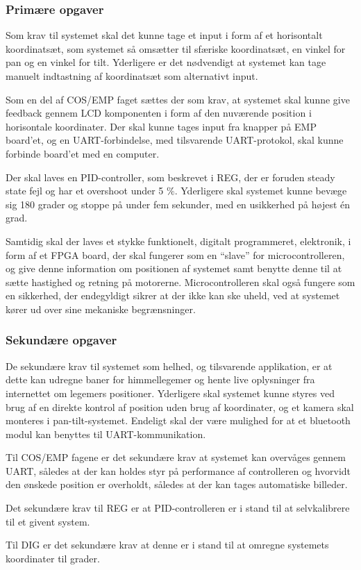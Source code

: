 \subsubsection{Primære opgaver}

Som krav til systemet skal det kunne tage et input i form af et horisontalt koordinatsæt, som systemet så omsætter til sfæriske koordinatsæt, en vinkel for pan og en vinkel for tilt. Yderligere er det nødvendigt at systemet kan tage manuelt indtastning af koordinatsæt som alternativt input.

Som en del af COS/EMP faget sættes der som krav, at systemet skal kunne give feedback gennem LCD komponenten i form af den nuværende position i horisontale koordinater. Der skal kunne tages input fra knapper på EMP board'et, og en UART-forbindelse, med tilsvarende UART-protokol, skal kunne forbinde board'et med en computer.

Der skal laves en PID-controller, som beskrevet i REG, der er foruden steady state fejl og har et overshoot under 5 $\%$. Yderligere skal systemet kunne bevæge sig 180 grader og stoppe på under fem sekunder, med en usikkerhed på højest én grad.

Samtidig skal der laves et stykke funktionelt, digitalt programmeret, elektronik, i form af et FPGA board, der skal fungerer som en ``slave'' for microcontrolleren, og give denne information om positionen af systemet samt benytte denne til at sætte hastighed og retning på motorerne. Microcontrolleren skal også fungere som en sikkerhed, der endegyldigt sikrer at der ikke kan ske uheld, ved at systemet kører ud over sine mekaniske begrænsninger.

\subsubsection{Sekundære opgaver}

De sekundære krav til systemet som helhed, og tilsvarende applikation, er at dette kan udregne baner for himmellegemer og hente live oplysninger fra internettet om legemers positioner. Yderligere skal systemet kunne styres ved brug af en direkte kontrol af position uden brug af koordinater, og et kamera skal monteres i pan-tilt-systemet. Endeligt skal der være mulighed for at et bluetooth modul kan benyttes til UART-kommunikation.

Til COS/EMP fagene er det sekundære krav at systemet kan overvåges gennem UART, således at der kan holdes styr på performance af controlleren og hvorvidt den ønskede position er overholdt, således at der kan tages automatiske billeder.

Det sekundære krav til REG er at PID-controlleren er i stand til at selvkalibrere til et givent system.

Til DIG er det sekundære krav at denne er i stand til at omregne systemets koordinater til grader.
